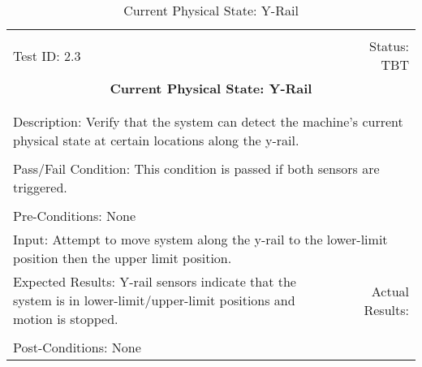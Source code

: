 \documentclass[titlepage]{article}
\begin{document}
\begin{center}%
\begin{table}
\begin{tabular}{|l r|}\hline&\\[-2mm]
	Test ID: 2.3	&Status: TBT\\[-3mm]
	\multicolumn{2}{|c|}{\textbf{\large{Current Physical State: Y-Rail}}}\\&\\\hline&\\[-3mm]
	\multicolumn{2}{|p{\textwidth}|}{Description: Verify that the system can detect the machine's current physical state at certain locations along the y-rail.}\\[1mm]\hline&\\[-3mm]
	\multicolumn{2}{|p{\textwidth}|}{Pass/Fail Condition: This condition is passed if both sensors are triggered.}\\[1mm]\hline&\\[-3mm]
	\multicolumn{2}{|p{\textwidth}|}{Pre-Conditions: None}\\[4mm]
	\multicolumn{2}{|p{\textwidth}|}{Input: Attempt to move system along the y-rail to the lower-limit position then the upper limit position.}\\[2mm]\hline
	\multicolumn{1}{|p{0.49\textwidth}}{Expected Results: Y-rail sensors indicate that the system is in lower-limit/upper-limit positions and motion is stopped.}	&\multicolumn{1}{|p{0.45\textwidth}|}{Actual Results:}\\\hline&\\[-3mm]
	\multicolumn{2}{|p{\textwidth}|}{Post-Conditions: None}\\\hline
\end{tabular}
\caption{Current Physical State: Y-Rail}
\end{table}
\end{center}
\end{document}
